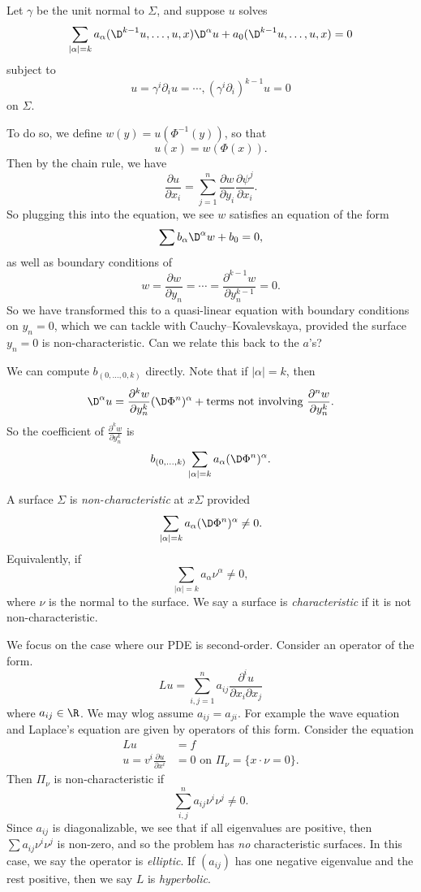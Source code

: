 \documentclass[a4paper]{article}
\begin{document}
Let $\gamma$ be the unit normal to $\Sigma$, and suppose $u$ solves
\[
  \sum_{|\alpha| = k} a_\alpha (\D^{k - 1} u, \ldots, u, x) \D^\alpha u + a_0(\D^{k - 1} u, \ldots, u, x) = 0
\]
subject to
\[
  u = \gamma^i \partial_i u = \cdots,(\gamma^i \partial_i)^{k- 1}u = 0
\]
on $\Sigma$.

To do so, we define $w(y) = u(\Phi^{-1}(y))$, so that
\[
  u(x) = w(\Phi(x)).
\]
Then by the chain rule, we have
\[
  \frac{\partial u}{\partial x_i} = \sum_{j = 1}^n \frac{\partial w}{\partial y_i} \frac{\partial \psi^j}{\partial x_i}.
\]
So plugging this into the equation, we see $w$ satisfies an equation of the form
\[
  \sum b_\alpha \D^\alpha w + b_0 = 0,
\]
as well as boundary conditions of
\[
  w = \frac{\partial w}{\partial y_n} = \cdots = \frac{\partial^{k - 1}w }{\partial y_n^{k - 1}} = 0.
\]
So we have transformed this to a quasi-linear equation with boundary conditions on $y_n = 0$, which we can tackle with Cauchy--Kovalevskaya, provided the surface $y_n = 0$ is non-characteristic. Can we relate this back to the $a$'s?

We can compute $b_{(0, \ldots, 0, k)}$ directly. Note that if $|\alpha| = k$, then
\[
  \D^\alpha u = \frac{\partial^k w}{\partial y_n^k} (\D \Phi^n)^\alpha + \text{terms not involving $\frac{\partial^n w}{\partial y_n^k}$}.
\]
So the coefficient of $\frac{\partial^k w}{\partial y_n^k}$ is
\[
  b_{(0, \ldots, k)} \sum_{|\alpha| = k} a_\alpha( \D \Phi^n)^\alpha.
\]
\begin{defi}
  A surface $\Sigma$ is \emph{non-characteristic} at $x \Sigma$ provided
  \[
    \sum_{|\alpha| = k} a_\alpha (\D \Phi^n)^\alpha \not= 0.
  \]
  Equivalently, if
  \[
    \sum_{|\alpha| = k} a_\alpha \nu^\alpha \not= 0,
  \]
  where $\nu$ is the normal to the surface. We say a surface is \emph{characteristic} if it is not non-characteristic.
\end{defi}

We focus on the case where our PDE is second-order. Consider an operator of the form.
\[
  Lu = \sum_{i, j = 1}^n a_{ij} \frac{\partial^i u}{\partial x_i \partial x_j}
\]
where $a_{ij} \in \R$. We may wlog assume $a_{ij} = a_{ji}$. For example the wave equation and Laplace's equation are given by operators of this form. Consider the equation
\begin{align*}
  Lu &= f\\
  u = v^i \frac{\partial u}{\partial x^i} &= 0 \text{ on }\Pi_\nu = \{x \cdot \nu = 0\}.
\end{align*}
Then $\Pi_\nu$ is non-characteristic if
\[
  \sum_{i, j}^n a_{ij} \nu^i \nu^j \not= 0.
\]
Since $a_{ij}$ is diagonalizable, we see that if all eigenvalues are positive, then $\sum a_{ij} \nu^i \nu^j$ is non-zero, and so the problem has \emph{no} characteristic surfaces. In this case, we say the operator is \emph{elliptic}. If $(a_{ij})$ has one negative eigenvalue and the rest positive, then we say $L$ is \emph{hyperbolic}.
\end{document}

